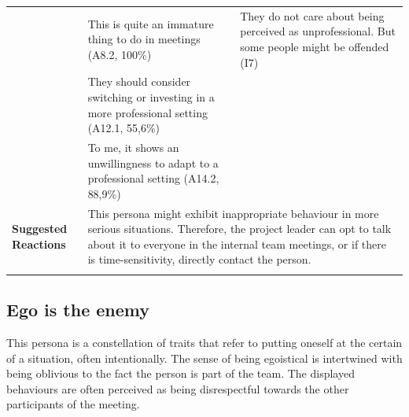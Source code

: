 \begin{longtable}[ht]{ p{}  p{} p{} }
     & This is quite an immature thing to do in meetings (A8.2, 100\%) & They do not care about being perceived as unprofessional. But some people might be offended (I7) \\
 	 & They should consider switching or investing in a more professional setting (A12.1, 55,6\%) \\
 	 & To me,  it shows an unwillingness to adapt to a professional setting (A14.2, 88,9\%) \\
 	\hline
    \textbf{Suggested Reactions} & \multicolumn{2}{p{.80\textwidth}}{This persona might exhibit inappropriate behaviour in more serious situations. Therefore, the project leader can opt to talk about it to everyone in the internal team meetings, or if there is time-sensitivity, directly contact the person.} \\
    \hline
\label{tab:multicol}
\end{longtable}

\subsection{Ego is the enemy}

This persona is a constellation of traits that refer to putting oneself at the certain of a situation, often intentionally. The sense of being egoistical is intertwined with being oblivious to the fact the person is part of the team. The displayed behaviours are often perceived as being disrespectful towards the other participants of the meeting. 

